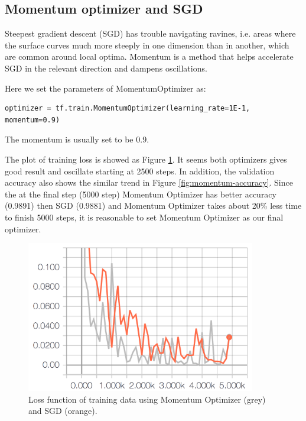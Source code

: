 \documentclass[11pt]{article}
\begin{document}
\subsection{Momentum optimizer and SGD}
Steepest gradient descent (SGD) has trouble navigating ravines, i.e. areas where the surface curves much more steeply in one dimension than in another, which are common around local optima. Momentum is a method that helps accelerate SGD in the relevant direction and dampens oscillations. 

Here we set the parameters of MomentumOptimizer as: 

\begin{lstlisting}
optimizer = tf.train.MomentumOptimizer(learning_rate=1E-1, momentum=0.9)
\end{lstlisting}

The momentum is usually set to be 0.9.

The plot of training loss is showed as Figure \ref{fig:momentum-loss}. It seems both optimizers gives good result and oscillate starting at 2500 steps. In addition, the validation accuracy also shows the similar trend in Figure \ref{fig:momentum-accuracy}. Since the at the final step (5000 step) Momentum Optimizer has better accuracy (0.9891) then SGD (0.9881) and  Momentum Optimizer takes about 20\% less time to finish 5000 steps, it is reasonable to set Momentum Optimizer as our final optimizer.

\begin{figure}[!htb]
   \centering
   \includegraphics[width=10cm]{images/optimizer-loss.png} %
   \caption{Loss function of training data using Momentum Optimizer (grey) and SGD (orange).}
   \label{fig:momentum-loss}
\end{figure}
\end{document}

